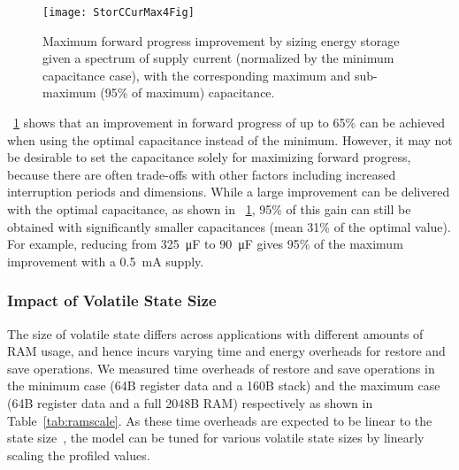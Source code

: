 \begin{figure}[!t]
  \centering
  \texttt{[image: StorCCurMax4Fig]}
  \caption{Maximum forward progress improvement by sizing energy storage given a spectrum of supply current (normalized by the minimum capacitance case), with the corresponding maximum and sub-maximum (95\% of maximum) capacitance. }
  \label{fig:maxfwp}
\end{figure}

\figurename{~\ref{fig:maxfwp}} shows that an improvement in forward progress of up to 65\%  can be achieved when using the optimal capacitance instead of the minimum. However, it may not be desirable to set the capacitance solely for maximizing forward progress, because there are often trade-offs with other factors including increased interruption periods and dimensions. 
While a large improvement can be delivered with the optimal capacitance, as shown in \figurename{~\ref{fig:maxfwp}}, 95\% of this gain can still be obtained with significantly smaller capacitances (mean 31\% of the optimal value).
For example, reducing from \SI{325}{\micro\farad} to \SI{90}{\micro\farad} gives 95\% of the maximum improvement with a \SI{0.5}{\milli\ampere} supply. 


\subsubsection{Impact of Volatile State Size}

The size of volatile state differs across applications with different amounts of RAM usage, and hence incurs varying time and energy overheads for restore and save operations. We measured time overheads of restore and save operations in the minimum case (64B register data and a 160B stack) and the maximum case (64B register data and a full 2048B RAM) respectively as shown in Table~\ref{tab:ramscale}. As these time overheads are expected to be linear to the state size~\cite{Sliper:2019:ESR:3316781.3317812}, the model can be tuned for various volatile state sizes by linearly scaling the profiled values. 


